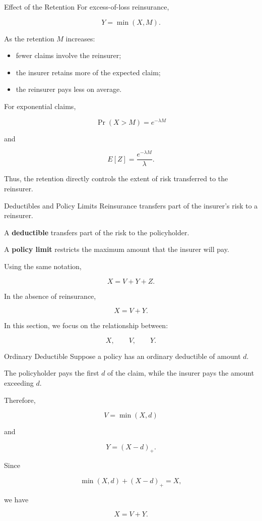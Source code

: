\documentclass[
  ignorenonframetext,
  aspectratio=169,
]{beamer}
\providecommand{\tightlist}{%
  \setlength{\itemsep}{0pt}\setlength{\parskip}{0pt}}
\begin{document}
\begin{frame}{Effect of the Retention}
\protect{}\label{effect-of-the-retention}
For excess-of-loss reinsurance,

\[
Y=\min(X,M).
\]

As the retention \(M\) increases:

\begin{itemize}
\tightlist
\item
  fewer claims involve the reinsurer;
\item
  the insurer retains more of the expected claim;
\item
  the reinsurer pays less on average.
\end{itemize}

For exponential claims,

\[
\Pr(X>M)=e^{-\lambda M}
\]

and

\[
E[Z]=\frac{e^{-\lambda M}}{\lambda}.
\]

Thus, the retention directly controls the extent of risk transferred to
the reinsurer.
\end{frame}

\begin{frame}{Deductibles and Policy Limits}
\protect{}\label{deductibles-and-policy-limits}
Reinsurance transfers part of the insurer's risk to a reinsurer.

A \textbf{deductible} transfers part of the risk to the policyholder.

A \textbf{policy limit} restricts the maximum amount that the insurer
will pay.

Using the same notation,

\[
X=V+Y+Z.
\]

In the absence of reinsurance,

\[
\boxed{X=V+Y}.
\]

In this section, we focus on the relationship between:

\[
X,\qquad V,\qquad Y.
\]
\end{frame}

\begin{frame}{Ordinary Deductible}
\protect{}\label{ordinary-deductible}
Suppose a policy has an ordinary deductible of amount \(d\).

The policyholder pays the first \(d\) of the claim, while the insurer
pays the amount exceeding \(d\).

Therefore,

\[
\boxed{V=\min(X,d)}
\]

and

\[
\boxed{Y=(X-d)_+}.
\]

Since

\[
\min(X,d)+(X-d)_+=X,
\]

we have

\[
\boxed{X=V+Y}.
\]
\end{frame}
\end{document}
